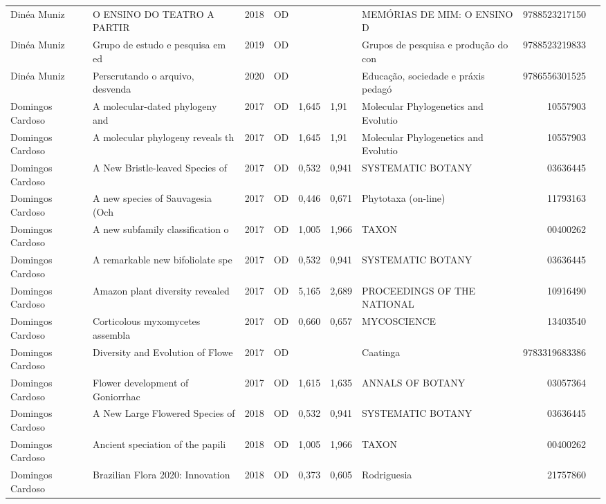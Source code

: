 \documentclass[12pt,brazil]{article}\usepackage[]{graphicx}\usepackage[]{xcolor}
\begin{document}
\begin{longtable}{lllrrllrr}
Dinéa Muniz & O ENSINO DO TEATRO A PARTIR & 2018 & OD &  &  & MEMÓRIAS DE MIM: O ENSINO D & 9788523217150 \\
Dinéa Muniz & Grupo de estudo e pesquisa em ed & 2019 & OD &  &  & Grupos de pesquisa e produção do con & 9788523219833 \\
Dinéa Muniz & Perscrutando o arquivo, desvenda & 2020 & OD &  &  & Educação,  sociedade e práxis pedagó & 9786556301525 \\
\rowcolor{coautr}\rowcolor{coautr}\rowcolor{coautr}\rowcolor{coautr}\rowcolor{coautr}\rowcolor{coautr}\rowcolor{coautr}\rowcolor{coautr}\rowcolor{coautr}\rowcolor{coautr}\rowcolor{coautr}\rowcolor{coautr}\rowcolor{coautr}\rowcolor{coautr}\rowcolor{coautr}\rowcolor{coautr}Domingos Cardoso & A molecular-dated phylogeny and  & 2017 & OD & 1,645 & 1,91 & Molecular Phylogenetics and Evolutio & 10557903 \\
Domingos Cardoso & A molecular phylogeny reveals th & 2017 & OD & 1,645 & 1,91 & Molecular Phylogenetics and Evolutio & 10557903 \\
Domingos Cardoso & A New Bristle-leaved Species of  & 2017 & OD & 0,532 & 0,941 & SYSTEMATIC BOTANY & 03636445 \\
Domingos Cardoso & A new species of Sauvagesia (Och & 2017 & OD & 0,446 & 0,671 & Phytotaxa (on-line) & 11793163 \\
Domingos Cardoso & A new subfamily classification o & 2017 & OD & 1,005 & 1,966 & TAXON & 00400262 \\
Domingos Cardoso & A remarkable new bifoliolate spe & 2017 & OD & 0,532 & 0,941 & SYSTEMATIC BOTANY & 03636445 \\
Domingos Cardoso & Amazon plant diversity revealed  & 2017 & OD & 5,165 & 2,689 & PROCEEDINGS OF THE NATIONAL & 10916490 \\
Domingos Cardoso & Corticolous myxomycetes assembla & 2017 & OD & 0,660 & 0,657 & MYCOSCIENCE & 13403540 \\
Domingos Cardoso & Diversity and Evolution of Flowe & 2017 & OD &  &  & Caatinga & 9783319683386 \\
Domingos Cardoso & Flower development of Goniorrhac & 2017 & OD & 1,615 & 1,635 & ANNALS OF BOTANY & 03057364 \\
Domingos Cardoso & A New Large Flowered Species of  & 2018 & OD & 0,532 & 0,941 & SYSTEMATIC BOTANY & 03636445 \\
Domingos Cardoso & Ancient speciation of the papili & 2018 & OD & 1,005 & 1,966 & TAXON & 00400262 \\
Domingos Cardoso & Brazilian Flora 2020: Innovation & 2018 & OD & 0,373 & 0,605 & Rodriguesia & 21757860 \\

\end{longtable}
\end{document}
